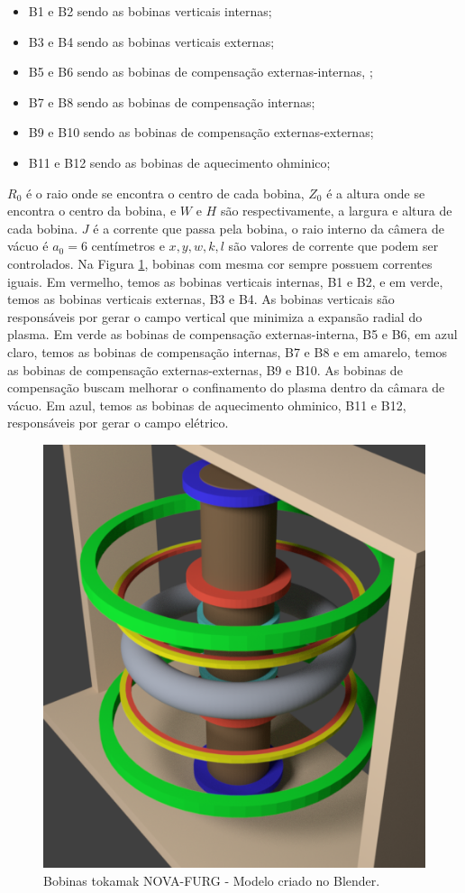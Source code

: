 \documentclass[12pt,oneside,a4paper]{abntex2}
\begin{document}
\begin{itemize}
\item B1 e B2 sendo as bobinas verticais internas; 
\item B3 e B4 sendo as bobinas verticais externas;  
\item B5 e B6 sendo as bobinas de compensação externas-internas, ; 
\item B7 e B8 sendo as bobinas de compensação internas;
\item B9 e B10 sendo as bobinas de compensação externas-externas;
\item B11 e B12 sendo as bobinas de aquecimento ohminico;
\end{itemize}
$R_0$ é o raio onde se encontra o centro de cada bobina, $Z_0$ é a altura onde se encontra o centro da bobina, e $W$ e $H$ são respectivamente, a largura e altura de cada bobina.  $J$ é a corrente que passa pela bobina, o raio interno da câmera de vácuo é $a_0=6$ centímetros e $x,y,w,k,l$ são valores de corrente que podem ser controlados.
Na Figura \ref{fig: btokamak}, bobinas com mesma cor sempre possuem correntes iguais. 
Em vermelho, temos as bobinas verticais internas, B1 e B2, e em verde, temos as bobinas verticais externas, B3 e B4. As bobinas verticais são responsáveis por gerar o campo vertical que minimiza a expansão radial do plasma. 
Em verde as bobinas de compensação externas-interna, B5 e B6, em azul claro, temos as bobinas de compensação internas, B7 e B8 e em amarelo, temos as bobinas de compensação externas-externas, B9 e B10. As bobinas de compensação buscam melhorar o confinamento do plasma dentro da câmara de vácuo.
Em azul, temos as bobinas de aquecimento ohminico, B11 e B12, responsáveis por gerar o campo elétrico. 
\begin{figure}[H]
\centering
\includegraphics[scale=0.7]{bob2.png}  
\caption{Bobinas tokamak NOVA-FURG - Modelo criado no Blender.}
\label{fig: btokamak}
\end{figure}
\end{document}
